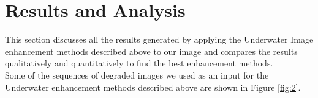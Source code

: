 \documentclass[a4paper,11pt,oneside]{article}
\begin{document}
  \section{Results and Analysis}
  \label{sec:4}


  This section discusses all the results generated by applying the Underwater Image enhancement methods described above to our image and compares the results qualitatively and quantitatively to find the best enhancement methods.\\
  Some of the sequences of degraded images we used as an input for the Underwater enhancement methods described above are shown in Figure \ref{fig:2}.\\
\end{document}
